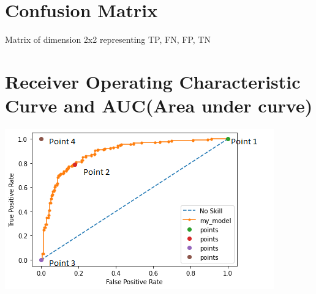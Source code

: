 \documentclass[12pt, letterpaper, twoside]{article}
\begin{document}
\section{Confusion Matrix}

Matrix of dimension 2x2 representing TP, FN, FP, TN

\section{Receiver Operating Characteristic Curve and AUC(Area under curve)}

\includegraphics{roc_curve.png}
\end{document}
